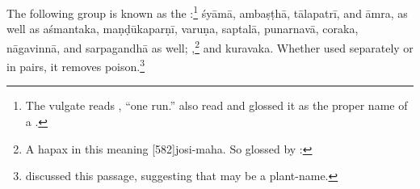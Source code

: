 \begin{translation}
\item[84ab--86]
    
The following group is known as the :\footnote{The vulgate reads , “one run.”
     also read  and glossed it as the
    proper name of a .} \gls{śyāmā}, \gls{ambaṣṭhā},
    \gls{tālapatrī}, and \gls{āmra}, as well as \gls{aśmantaka},
    \gls{maṇḍūkaparṇī}, \gls{varuṇa}, \gls{saptalā}, \gls{punarnavā},
    \gls{coraka}, \gls{nāgavinnā}, and \gls{sarpagandhā} as well;
    ,\footnote{A hapax in this meaning
        [582]{josi-maha}.  So glossed by :
        } and \gls{kuravaka}. Whether used
        separately or in pairs, it  removes
        poison.\footnote{\citet[55--56]{das-1983} discussed
            this passage, suggesting that  may be a
            plant-name.}


    
    \strut
    \bigskip
    
       
  
\end{translation}    
